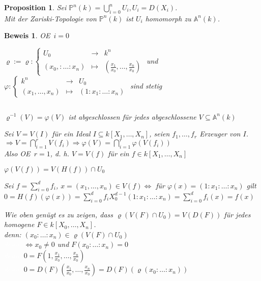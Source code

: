 \documentclass[a4paper,12pt]{report}
\theoremstyle{break}
\newtheorem{Prop}[Def]{Proposition}
\theoremstyle{nonumberbreak}
\newtheorem{Bew}{Beweis}
\theoremstyle{nonumberplain}
\newcommand{\Sum}{\sum\limits}
\newcommand{\A}{\mathbb{A}}
\newcommand{\IP}{\mathbb{P}}%
\renewcommand{\OE}{O\!\!E~}
\begin{document}
\begin{Prop}
Sei $\IP^n(k)=\bigcup\limits_{i=0}^nU_i, U_i=D(X_i)$.\\
Mit der Zariski-Topologie von $\IP^n(k)$ ist $U_i$ homomorph zu $\A^n(k)$.
\end{Prop}

\begin{Bew}
\OE $i=0$\begin{description}[\setlabelstyle{\itshape}]
\item[Zeige:]$\ $\\%
	$\varrho:=\varrho: \left\{\begin{array}{rcl}U_0&\to&k^n\\(x_0,:\ldots :x_n)&\mapsto&(\frac{x_1}{x_0},\ldots ,\frac{x_n}{x_0})\end{array}\right.$ und $\varphi: \left\{\begin{array}{rcl}k^n&\to&U_0\\(x_1,\ldots ,x_n)&\mapsto&(1:x_1:\ldots :x_n)\end{array}\right.$ sind stetig

\item[$\varrho$ stetig:]$\ $
	\begin{description}[\setlabelstyle{\itshape}]
	\item[Zeige:] $\varrho^{-1}(V)=\varphi(V)$ ist abgeschlossen f\"ur jedes abgeschlossene $V\subseteq\A^n(k)$
	\end{description}
	Sei $V=V(I)$ f\"ur ein Ideal $I\subseteq k[X_1,\ldots ,X_n]$, seien $f_1,\ldots ,f_r$ Erzeuger von $I$.\\
	$\Rightarrow V=\bigcap\limits_{i=1}^rV(f_i)\Rightarrow \varphi(V)=\bigcap\limits_{i=1}^r\varphi(V(f_i))$\\
	Also \OE $r=1$, d. h. $V=V(f)$ f\"ur ein $f\in k[X_1,\ldots ,X_n]$
	\begin{description}[\setlabelstyle{\itshape}]
	\item[Behauptung:] $\varphi(V(f))=V(H(f))\cap U_0$
	\item[denn:] Sei $f=\Sum_{i=0}^df_i$, $x=(x_1,\ldots ,x_n)\in V(f)\Leftrightarrow$ f\"ur $\varphi(x)=(1:x_1:\ldots:x_n)$ gilt $0=H(f)(\varphi(x))=\Sum_{i=0}^df_iX_0^{d-1}(1:x_1:\ldots :x_n)=\Sum_{i=0}^df_i(x)=f(x)$
	\end{description}

\item[$\varphi$ stetig:]$\ $\\
	Wie oben gen\"ugt es zu zeigen, dass $\varrho(V(F)\cap U_0)=V(D(F))$ f\"ur jedes homogene $F\in k[X_0,\ldots ,X_n]$.\\
	\emph{denn:} $(x_0:\ldots :x_n)\in \varrho(V(F)\cap U_0)$\\
	\textcolor{white}{\emph{denn:}} $\Leftrightarrow x_0\not=0$ und $F(x_0:\ldots :x_n)=0$\\
	\textcolor{white}{\emph{denn:}} $0=F(1,\frac{x_1}{x_0},\ldots ,\frac{x_n}{x_0})$\\
	\textcolor{white}{\emph{denn:}} $0=D(F)(\frac{x_1}{x_0},\ldots ,\frac{x_n}{x_0})= D(F)(\varrho(x_0:\ldots :x_n))$
\end{description}\end{Bew}
\end{document}
